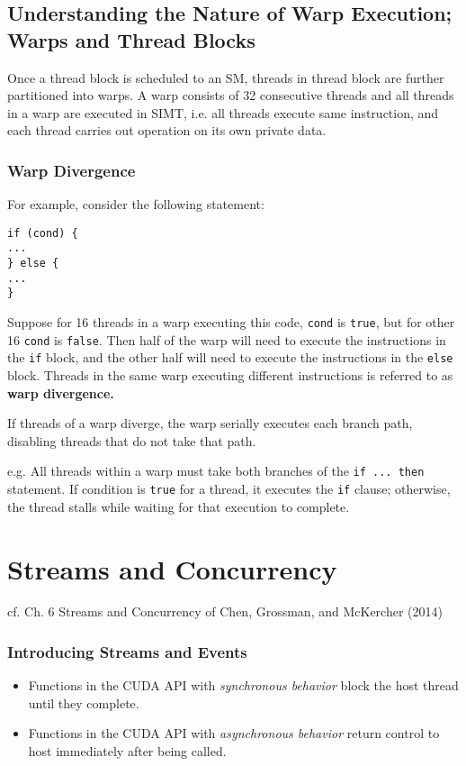 \documentclass[10pt]{amsart}
\begin{document}
\begin{multicols*}{2}
\subsection{Understanding the Nature of Warp Execution; Warps and Thread Blocks}  

Once a thread block is scheduled to an SM, threads in thread block are further partitioned into warps.  A warp consists of 32 consecutive threads and all threads in a warp are executed in SIMT, i.e. all threads execute same instruction, and each thread carries out operation on its own private data.  

\subsubsection{Warp Divergence }

For example, consider the following statement:  
\begin{lstlisting}  
if (cond) {
...   
} else {
...
}
\end{lstlisting}

Suppose for 16 threads in a warp executing this code, \verb|cond| is \verb|true|, but for other 16 \verb|cond| is \verb|false|.  Then half of the warp will need to execute the instructions in the \verb|if| block, and the other half will need to execute the instructions in the \verb|else| block.  Threads in the same warp executing different instructions is referred to as \textbf{warp divergence.} 

If threads of a warp diverge, the warp serially executes each branch path, disabling threads that do not take that path.  

e.g. All threads within a warp must take both branches of the \verb|if ... then| statement.  If condition is \verb|true| for a thread, it executes the \verb|if| clause; otherwise, the thread stalls while waiting for that execution to complete.  


\section{Streams and Concurrency}  
cf. Ch. 6 Streams and Concurrency of  Chen, Grossman, and McKercher (2014) \cite{CGM2014}
\subsubsection{Introducing Streams and Events}
\begin{itemize}
	\item Functions in the CUDA API with \emph{synchronous behavior} block the host thread until they complete.  
	\item Functions in the CUDA API with \emph{asynchronous behavior} return control to host immediately after being called.  
\end{itemize}  


\end{multicols*}
\end{document}
